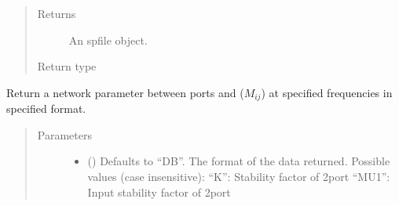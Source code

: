 \documentclass[letterpaper,10pt,english]{sphinxmanual}
\begin{document}
\begin{fulllineitems}
\begin{fulllineitems}
\begin{quote}
\begin{description}
\begin{itemize}
\end{itemize}

\item[{Returns}] \leavevmode
An spfile object.

\item[{Return type}] \leavevmode
{\hyperref[\detokenize{touchstone:touchstone.spfile}]{}}

\end{description}\end{quote}

\end{fulllineitems}


\begin{fulllineitems}
\label{\detokenize{touchstone:touchstone.spfile.data_array}}
Return a network parameter between ports  and  (\(M_{i j}\)) at specified frequencies in specified format.
\begin{quote}\begin{description}
\item[{Parameters}] \leavevmode\begin{itemize}
\item {} 
 (\sphinxstyleliteralemphasis{\sphinxupquote{, }}) \textendash{} Defaults to “DB”. The format of the data returned. Possible values (case insensitive):
\sphinxhyphen{}   “K”: Stability factor of 2\sphinxhyphen{}port
\sphinxhyphen{}   “MU1”: Input stability factor of 2\sphinxhyphen{}port

\end{itemize}
\end{description}
\end{quote}
\end{fulllineitems}
\end{fulllineitems}
\end{document}
